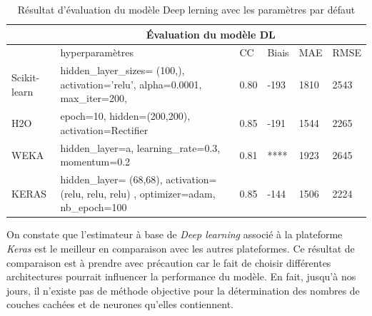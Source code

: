 \begin{table}[ht]
    \centering
    \begin{tabular}{ |p{1.6cm}|p{4cm}|p{1.6cm}|p{1.6cm}|p{1.6cm}|p{1.6cm}|  }
     \hline
     & \multicolumn{5}{|c|}{Évaluation du modèle DL} \\
     \hline
     & hyperparamètres & CC & Biais & MAE & RMSE\\
     \hline
      \vspace{5mm} Scikit-learn 
      & hidden\_layer\_sizes= (100,), activation='relu', alpha=0.0001, max\_iter=200,
      &\vspace{5mm} 0.80 &\vspace{5mm} -193 &\vspace{5mm} 1810 &\vspace{5mm} 2543\\
     \hline
     \vspace{5mm} H2O 
      & epoch=10, hidden=(200,200), activation=Rectifier
      & \vspace{5mm} 0.85 & \vspace{5mm} -191 & \vspace{5mm} 1544 & \vspace{5mm} 2265 \\
     \hline
     \vspace{5mm} WEKA 
      & hidden\_layer=a, learning\_rate=0.3, momentum=0.2
      & \vspace{5mm} 0.81  & \vspace{5mm} **** & \vspace{5mm} 1923 & \vspace{5mm} 2645\\
     \hline
     \vspace{5mm} KERAS 
      & hidden\_layer= (68,68), activation= (relu, relu, relu) , optimizer=adam, nb\_epoch=100
      & \vspace{5mm} 0.85  & \vspace{5mm} -144 & \vspace{5mm} 1506  & \vspace{5mm} 2224 \\
     \hline
     \end{tabular}
     \caption{Résultat d'évaluation du modèle Deep lerning avec les paramètres par défaut}
    \label{dl_default}
\end{table}

 On constate que l'estimateur à base de \textit{Deep learning} associé à la plateforme \textit{Keras} est le meilleur en comparaison avec les autres plateformes. Ce résultat de comparaison est à prendre avec précaution car le fait de choisir différentes architectures pourrait influencer la performance du modèle. En fait, jusqu'à nos jours, il n'existe pas de méthode objective pour la détermination des nombres de couches cachées et de neurones qu'elles contiennent.


